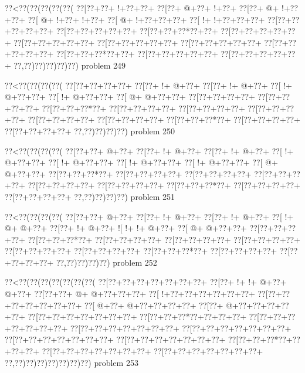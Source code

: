 \vbox{\vbox{\goo
\0??<\0??(\0??(\0??(\0??(\0??(
\0??[\0??+\0??+\- !+\0??+\0??+
\0??[\0??+\- @+\0??+\- !+\0??+
\0??[\0??+\- @+\- !+\0??+\0??+
\0??[\- @+\- !+\0??+\- !+\0??+
\0??[\- @+\- !+\0??+\0??+\0??+
\0??[\- !+\- !+\0??+\0??+\0??+
\0??[\0??+\0??+\0??+\0??+\0??+
\0??[\0??+\0??+\0??+\0??+\0??+
\0??[\0??+\0??+\0??*\0??+\0??+
\0??[\0??+\0??+\0??+\0??+\0??+
\0??[\0??+\0??+\0??+\0??+\0??+
\0??[\0??+\0??+\0??+\0??+\0??+
\0??[\0??+\0??+\0??+\0??+\0??+
\0??[\0??+\0??+\0??+\0??+\0??+
\0??[\0??+\0??+\0??*\0??+\0??+
\0??[\0??+\0??+\0??+\0??+\0??+
\0??[\0??+\0??+\0??+\0??+\0??+
\0??,\0??)\0??)\0??)\0??)\0??)
}
\hfil problem 249\hfil\break
}

\vbox{\vbox{\goo
\0??<\0??(\0??(\0??(\0??(
\0??[\0??+\0??+\0??+\0??+
\0??[\0??+\- !+\- @+\0??+
\0??[\0??+\- !+\- @+\0??+
\0??[\- !+\- @+\0??+\0??+
\0??[\- !+\- @+\0??+\0??+
\0??[\- @+\- @+\0??+\0??+
\0??[\0??+\0??+\0??+\0??+
\0??[\0??+\0??+\0??+\0??+
\0??[\0??+\0??+\0??*\0??+
\0??[\0??+\0??+\0??+\0??+
\0??[\0??+\0??+\0??+\0??+
\0??[\0??+\0??+\0??+\0??+
\0??[\0??+\0??+\0??+\0??+
\0??[\0??+\0??+\0??+\0??+
\0??[\0??+\0??+\0??*\0??+
\0??[\0??+\0??+\0??+\0??+
\0??[\0??+\0??+\0??+\0??+
\0??,\0??)\0??)\0??)\0??)
}
\hfil problem 250\hfil\break
}

\vbox{\vbox{\goo
\0??<\0??(\0??(\0??(\0??(
\0??[\0??+\0??+\- @+\0??+
\0??[\0??+\- !+\- @+\0??+
\0??[\0??+\- !+\- @+\0??+
\0??[\- !+\- @+\0??+\0??+
\0??[\- !+\- @+\0??+\0??+
\0??[\- !+\- @+\0??+\0??+
\0??[\- !+\- @+\0??+\0??+
\0??[\- @+\- @+\0??+\0??+
\0??[\0??+\0??+\0??*\0??+
\0??[\0??+\0??+\0??+\0??+
\0??[\0??+\0??+\0??+\0??+
\0??[\0??+\0??+\0??+\0??+
\0??[\0??+\0??+\0??+\0??+
\0??[\0??+\0??+\0??+\0??+
\0??[\0??+\0??+\0??*\0??+
\0??[\0??+\0??+\0??+\0??+
\0??[\0??+\0??+\0??+\0??+
\0??,\0??)\0??)\0??)\0??)
}
\hfil problem 251\hfil\break
}

\vbox{\vbox{\goo
\0??<\0??(\0??(\0??(\0??(
\0??[\0??+\0??+\- @+\0??+
\0??[\0??+\- !+\- @+\0??+
\0??[\0??+\- !+\- @+\0??+
\0??[\- !+\- @+\- @+\0??+
\0??[\0??+\- !+\- @+\0??+
\- ![\- !+\- !+\- @+\0??+
\0??[\- @+\- @+\0??+\0??+
\0??[\0??+\0??+\0??+\0??+
\0??[\0??+\0??+\0??*\0??+
\0??[\0??+\0??+\0??+\0??+
\0??[\0??+\0??+\0??+\0??+
\0??[\0??+\0??+\0??+\0??+
\0??[\0??+\0??+\0??+\0??+
\0??[\0??+\0??+\0??+\0??+
\0??[\0??+\0??+\0??*\0??+
\0??[\0??+\0??+\0??+\0??+
\0??[\0??+\0??+\0??+\0??+
\0??,\0??)\0??)\0??)\0??)
}
\hfil problem 252\hfil\break
}

\vbox{\vbox{\goo
\0??<\0??(\0??(\0??(\0??(\0??(\0??(\0??(
\0??[\0??+\0??+\0??+\0??+\0??+\0??+\0??+
\0??[\0??+\- !+\- !+\- @+\0??+\- @+\0??+
\0??[\0??+\0??+\- @+\- @+\0??+\0??+\0??+
\0??[\- !+\0??+\0??+\0??+\0??+\0??+\0??+
\0??[\0??+\0??+\0??+\0??+\0??+\0??+\0??+
\0??[\- @+\0??+\- @+\0??+\0??+\0??+\0??+
\0??[\0??+\- @+\0??+\0??+\0??+\0??+\0??+
\0??[\0??+\0??+\0??+\0??+\0??+\0??+\0??+
\0??[\0??+\0??+\0??*\0??+\0??+\0??+\0??+
\0??[\0??+\0??+\0??+\0??+\0??+\0??+\0??+
\0??[\0??+\0??+\0??+\0??+\0??+\0??+\0??+
\0??[\0??+\0??+\0??+\0??+\0??+\0??+\0??+
\0??[\0??+\0??+\0??+\0??+\0??+\0??+\0??+
\0??[\0??+\0??+\0??+\0??+\0??+\0??+\0??+
\0??[\0??+\0??+\0??*\0??+\0??+\0??+\0??+
\0??[\0??+\0??+\0??+\0??+\0??+\0??+\0??+
\0??[\0??+\0??+\0??+\0??+\0??+\0??+\0??+
\0??,\0??)\0??)\0??)\0??)\0??)\0??)\0??)
}
\hfil problem 253\hfil\break
}

